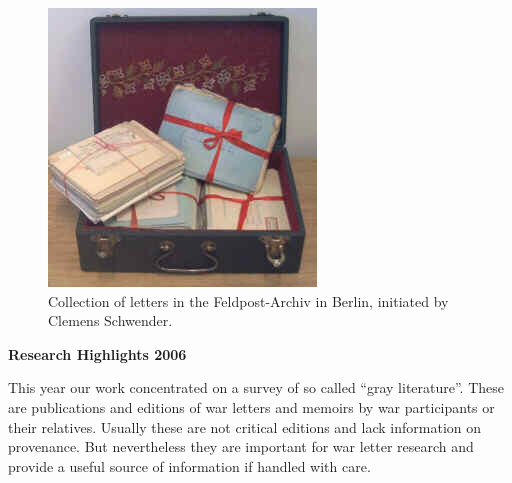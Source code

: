 \begin{figure}[h]
  \begin{center}
    \begin{minipage}[b]{0.40\linewidth}
   \includegraphics[width=\linewidth]{profClemensSchwender-fig2.jpg}
    \end{minipage}\hfill
    \begin{minipage}[b]{0.55\linewidth}
      \caption{Collection of letters in the Feldpost-Archiv in Berlin, initiated by Clemens Schwender.\label{fig2:profClemensSchwender}}
    \end{minipage}
  \end{center}
\end{figure}

\textbf{Research Highlights 2006}

 This year our work concentrated on a survey of so called ``gray literature''. These are publications and editions of war letters and memoirs by war participants or their relatives. Usually these are not critical editions and lack information on provenance. But nevertheless they are important for war letter research and provide a useful source of information if handled with care.


